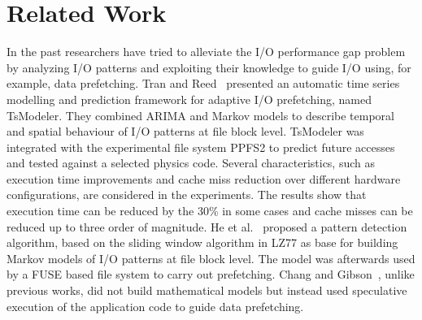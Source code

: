 \section{Related Work}
\label{sec: mercury_related_work}

In the past researchers have tried to alleviate the I/O performance gap problem by analyzing I/O patterns and exploiting their knowledge to guide I/O using, for example, data prefetching. Tran and Reed~\cite{TranR04} presented an automatic time series modelling and prediction framework for adaptive I/O prefetching, named TsModeler. They combined ARIMA and Markov models to describe temporal and spatial behaviour of I/O patterns at file block level. TsModeler was integrated with the experimental file system PPFS2 to predict future accesses and tested against a selected physics code. Several characteristics, such as execution time improvements and cache miss reduction over different hardware configurations, are considered in the experiments. The results show that execution time can be reduced by the 30\% in some cases and cache misses can be reduced up to three order of magnitude. 
He et al.~\cite{HEBTAGGMCS13} proposed a pattern detection algorithm, based on the sliding window algorithm in LZ77 as base for building Markov models of I/O patterns at file block level. The model was afterwards used by a FUSE based file system to carry out prefetching. Chang and Gibson~\cite{ChangG99}, unlike previous works, did not build mathematical models but instead used speculative execution of the application code to guide data prefetching.

